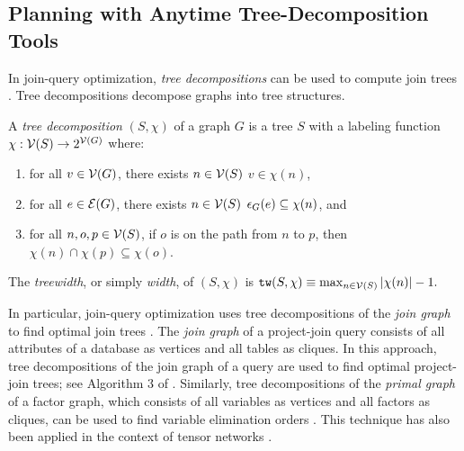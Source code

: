 \subsection{Planning with Anytime Tree-Decomposition Tools}
\label{sec_td}

In join-query optimization, \emph{tree decompositions} can be used to compute join trees \cite{dalmau2002constraint,mcmahan2004projection}.
Tree decompositions \cite{robertson1991graph} decompose graphs into tree structures.
\begin{definition}
	A \emph{tree decomposition} $(S, \chi)$ of a graph $G$ is a tree $S$ with a labeling function $\chi : \mathcal{V}(S) \to 2^{\mathcal{V}(G)}$ where:
	\begin{enumerate}[ref=\arabic*]
		\item for all $v \in \mathcal{V}(G)$, there exists $n \in \mathcal{V}(S)$ \st{} $v \in \chi(n)$,
		\item for all $e \in \mathcal{E}(G)$, there exists $n \in \mathcal{V}(S)$ \st{} $\epsilon_{G}(e) \subseteq \chi(n)$, and
		\item for all $n, o, p \in \mathcal{V}(S)$, if $o$ is on the path from $n$ to $p$, then $\chi(n) \cap \chi(p) \subseteq \chi(o)$. \label{prop_running_intersection}
	\end{enumerate}
	The \emph{treewidth}, or simply \emph{width}, of $(S, \chi)$ is $\texttt{\upshape tw}(S, \chi) \equiv \max_{n \in \mathcal{V}(S)} \left| \chi(n) \right| - 1.$
\end{definition}

In particular, join-query optimization uses tree decompositions of the \emph{join graph} to find optimal join trees \cite{dalmau2002constraint,mcmahan2004projection}.
The \emph{join graph} of a project-join query consists of all attributes of a database as vertices and all tables as cliques.
In this approach, tree decompositions of the join graph of a query are used to find optimal project-join trees; see Algorithm 3 of \cite{mcmahan2004projection}.
Similarly, tree decompositions of the \emph{primal graph} of a factor graph, which consists of all variables as vertices and all factors as cliques, can be used to find variable elimination orders \cite{kask2005unifying}.
This technique has also been applied in the context of tensor networks \cite{morgenstern2008ltl,dudek2019efficient}.

